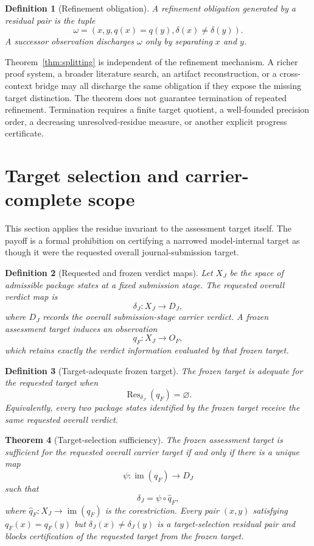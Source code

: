 \documentclass[10pt]{article}
\newtheorem{definition}{Definition}[section]
\newtheorem{theorem}[definition]{Theorem}
\newcommand{\Res}{\operatorname{Res}}
\begin{document}
\begin{definition}[Refinement obligation]
A refinement obligation generated by a residual pair is the tuple
\[
  \omega=(x,y,q(x)=q(y),\delta(x)\neq\delta(y)).
\]
A successor observation discharges $\omega$ only by separating $x$ and $y$.
\end{definition}

Theorem~\ref{thm:splitting} is independent of the refinement mechanism.  A richer proof system, a broader literature search, an artifact reconstruction, or a cross-context bridge may all discharge the same obligation if they expose the missing target distinction.  The theorem does not guarantee termination of repeated refinement.  Termination requires a finite target quotient, a well-founded precision order, a decreasing unresolved-residue measure, or another explicit progress certificate.



\section{Target selection and carrier-complete scope}

This section applies the residue invariant to the assessment target itself.  The payoff is a formal prohibition on certifying a narrowed model-internal target as though it were the requested overall journal-submission target.

\begin{definition}[Requested and frozen verdict maps]
Let $X_J$ be the space of admissible package states at a fixed submission stage.  The requested overall verdict map is
\[
  \delta_J:X_J\to D_J,
\]
where $D_J$ records the overall submission-stage carrier verdict.  A frozen assessment target induces an observation
\[
  q_F:X_J\to O_F,
\]
which retains exactly the verdict information evaluated by that frozen target.
\end{definition}

\begin{definition}[Target-adequate frozen target]
The frozen target is adequate for the requested target when
\[
  \Res_{\delta_J}(q_F)=\varnothing.
\]
Equivalently, every two package states identified by the frozen target receive the same requested overall verdict.
\end{definition}

\begin{theorem}[Target-selection sufficiency]\label{thm:target-selection}
The frozen assessment target is sufficient for the requested overall carrier target if and only if there is a unique map
\[
  \psi:\operatorname{im}(q_F)\to D_J
\]
such that
\[
  \delta_J=\psi\circ \widehat q_F,
\]
where $\widehat q_F:X_J\to\operatorname{im}(q_F)$ is the corestriction.
Every pair $(x,y)$ satisfying $q_F(x)=q_F(y)$ but $\delta_J(x)\neq\delta_J(y)$ is a target-selection residual pair and blocks certification of the requested target from the frozen target.
\end{theorem}
\end{document}
